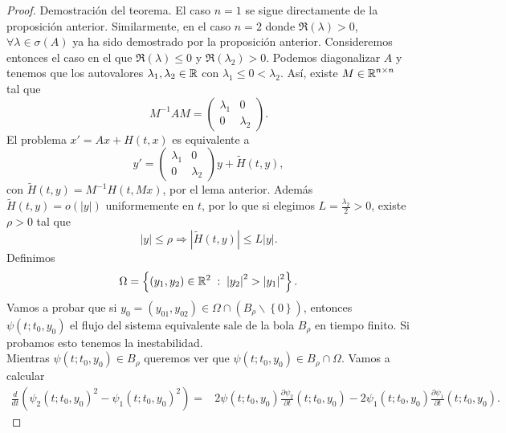 \begin{proof}
Demostración del teorema. El caso $\displaystyle n = 1 $ se sigue directamente de la proposición anterior. Similarmente, en el caso $\displaystyle n = 2 $ donde $\displaystyle \Re\left(\lambda \right) > 0 $, $\displaystyle \forall \lambda \in \sigma \left(A\right) $ ya ha sido demostrado por la proposición anterior. Consideremos entonces el caso en el que $\displaystyle \Re\left(\lambda \right)\leq 0 $ y $\displaystyle \Re\left(\lambda_{2}\right) > 0 $. Podemos diagonalizar $\displaystyle A $ y tenemos que los autovalores $\displaystyle \lambda_{1}, \lambda_{2} \in \mathbb{R} $ con $\displaystyle \lambda_{1} \leq 0 < \lambda_{2} $. 
Así, existe $\displaystyle M \in \mathbb{R} ^{n \times n} $ tal que 
\[M^{-1}AM = \begin{pmatrix} \lambda _{1} & 0 \\ 0 & \lambda_{2} \end{pmatrix} .\]
El problema $\displaystyle x '= A x + H\left(t,x\right) $ es equivalente a 
\[ y' = \begin{pmatrix} \lambda_{1} & 0 \\ 0 & \lambda_{2} \end{pmatrix}y + \tilde{H}\left(t, y\right) ,\]
con $\displaystyle \tilde{H}\left(t,y\right) = M^{-1}H\left(t, Mx\right) $, por el lema anterior. Además $\displaystyle \tilde{H}\left(t, y\right)=o \left( \left|y\right|\right) $ uniformemente en $\displaystyle t $, por lo que si elegimos $\displaystyle L = \frac{\lambda_{2}}{2} > 0 $, existe $\displaystyle \rho > 0 $ tal que 
\[ \left|y\right|\leq \rho \Rightarrow \left|\tilde{H}\left(t,y\right)\right|\leq L \left|y\right| .\]
Definimos
\[ \Omega = \left\{ \left(y_{1}, y_{2}\right)\in \mathbb{R}^{2} \; : \; \left|y_{2}\right|^{2}> \left|y_{1}\right|^{2}\right\}  .\]
Vamos a probar que si $\displaystyle y_{0}= \left(y_{01}, y_{02}\right)\in \Omega \cap \left(B_{\rho } \backslash \left\{ 0\right\} \right) $, entonces $\displaystyle \psi\left(t; t_{0}, y_{0}\right) $ el flujo del sistema equivalente sale de la bola $\displaystyle B_{\rho } $ en tiempo finito. Si probamos esto tenemos la inestabilidad. \\
\indent Mientras $\displaystyle \psi\left(t; t_{0}, y_{0}\right)\in B_{\rho } $ queremos ver que $\displaystyle \psi\left(t; t_{0}, y_{0}\right)\in B_{\rho }\cap \Omega  $. Vamos a calcular 
	\[
	\begin{split}
		\frac{d}{dt}\left(\psi_{2}\left(t; t_{0}, y_{0}\right)^{2}-\psi_{1}\left(t; t_{0}, y_{0}\right)^{2}\right) = & 2\psi\left(t; t_{0}, y_{0}\right) \frac{\partial \psi_{2}}{\partial t}\left(t; t_{0}, y_{0}\right)-2\psi_{1}\left(t; t_{0}, y_{0}\right)\frac{\partial \psi_{1}}{\partial t}\left(t; t_{0}, y_{0}\right) .

\end{split}\]
\end{proof}
